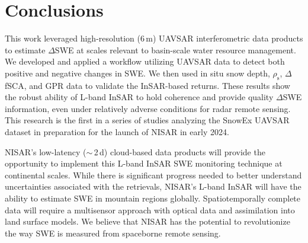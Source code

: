 \hypertarget{ch4-discussion-3}{\section{Conclusions}\label{ch4-discussion-3}}


This work leveraged high-resolution (6\,m) UAVSAR interferometric data products to estimate $\Delta$SWE at scales relevant to basin-scale water resource management. We developed and applied a workflow utilizing UAVSAR data to detect both positive and negative changes in SWE. We then used in situ snow depth, $\rho_\mathrm{s}$, $\Delta$fSCA, and GPR data to validate the InSAR-based returns. These results show the robust ability of L-band InSAR to hold coherence and provide quality $\Delta$SWE information, even under relatively adverse conditions for radar remote sensing. This research is the first in a series of studies analyzing the SnowEx UAVSAR dataset in preparation for the launch of NISAR in early 2024.

NISAR's low-latency ($\sim$\,2\,d) cloud-based data products will provide the opportunity to implement this L-band InSAR SWE monitoring technique at continental scales. While there is significant progress needed to better understand uncertainties associated with the retrievals, NISAR's L-band InSAR will have the ability to estimate SWE in mountain regions globally. Spatiotemporally complete data will require a multisensor approach with optical data and assimilation into land surface models. We believe that NISAR has the potential to revolutionize the way SWE is measured from spaceborne remote sensing.




